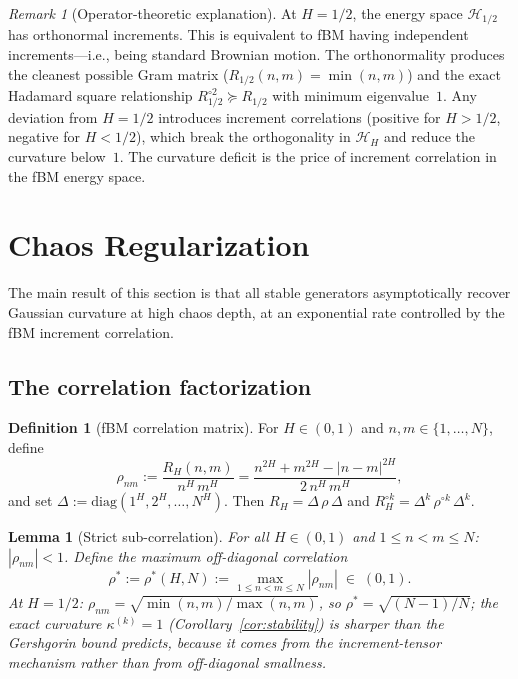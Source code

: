 \documentclass[11pt,a4paper]{article}
\theoremstyle{plain}
\newtheorem{lemma}[theorem]{Lemma}
\theoremstyle{definition}
\newtheorem{definition}[theorem]{Definition}
\theoremstyle{remark}
\newtheorem{remark}[theorem]{Remark}
\newcommand{\HH}{\mathcal{H}_H}
\begin{document}
\begin{remark}[Operator-theoretic explanation]
\label{rem:opt-mechanism}
At $H = 1/2$, the energy space $\mathcal{H}_{1/2}$ has
orthonormal increments.  This is equivalent to fBM having
independent increments---i.e., being standard Brownian
motion.  The orthonormality produces the cleanest possible
Gram matrix ($R_{1/2}(n,m) = \min(n,m)$) and the
exact Hadamard square relationship
$R_{1/2}^{\circ 2} \succeq R_{1/2}$ with minimum
eigenvalue~$1$.
Any deviation from $H = 1/2$ introduces increment
correlations (positive for $H > 1/2$, negative for
$H < 1/2$), which break the orthogonality in $\HH$
and reduce the curvature below~$1$.
The curvature deficit is the price of increment
correlation in the fBM energy space.
\end{remark}


\section{Chaos Regularization}\label{sec:regularization}

The main result of this section is that all stable generators
asymptotically recover Gaussian curvature at high chaos depth,
at an exponential rate controlled by the fBM increment
correlation.

\subsection{The correlation factorization}

\begin{definition}[fBM correlation matrix]\label{def:corr}
For $H \in (0,1)$ and $n,m \in \{1,\ldots,N\}$, define
\begin{equation}\label{eq:rho}
  \rho_{nm}
  := \frac{R_H(n,m)}{n^H\,m^H}
  = \frac{n^{2H} + m^{2H} - |n-m|^{2H}}{2\,n^H\,m^H},
\end{equation}
and set $\Delta := \mathrm{diag}(1^H, 2^H, \ldots, N^H)$.
Then $R_H = \Delta\,\rho\,\Delta$ and
$R_H^{\circ k} = \Delta^k\,\rho^{\circ k}\,\Delta^k$.
\end{definition}

\begin{lemma}[Strict sub-correlation]
\label{lem:strict}
For all $H \in (0,1)$ and $1 \leq n < m \leq N$:
$|\rho_{nm}| < 1$.  Define the maximum off-diagonal
correlation
\begin{equation}\label{eq:rhostar}
  \rho^* := \rho^*(H,N) :=
  \max_{1 \leq n < m \leq N} |\rho_{nm}| \;\in\; (0,1).
\end{equation}
At $H = 1/2$:
$\rho_{nm} = \sqrt{\min(n,m)/\max(n,m)}$,
so $\rho^* = \sqrt{(N{-}1)/N}$;
the exact curvature $\kappa^{(k)} = 1$
(Corollary~\textup{\ref{cor:stability}})
is sharper than the Gershgorin bound predicts,
because it comes from the increment-tensor mechanism
rather than from off-diagonal smallness.
\end{lemma}
\end{document}
